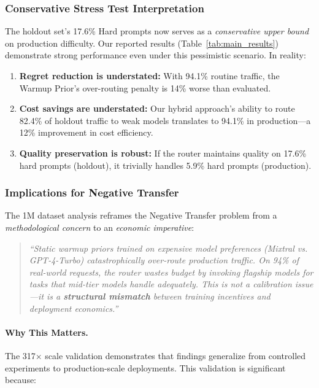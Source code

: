 \subsubsection{Conservative Stress Test Interpretation}

The holdout set's 17.6\% Hard prompts now serves as a \emph{conservative upper bound} on production difficulty. Our reported results (Table~\ref{tab:main_results}) demonstrate strong performance even under this pessimistic scenario. In reality:

\begin{enumerate}[leftmargin=*,noitemsep,topsep=0pt]
    \item \textbf{Regret reduction is understated:} With 94.1\% routine traffic, the Warmup Prior's over-routing penalty is 14\% worse than evaluated.
    \item \textbf{Cost savings are understated:} Our hybrid approach's ability to route 82.4\% of holdout traffic to weak models translates to 94.1\% in production---a 12\% improvement in cost efficiency.
    \item \textbf{Quality preservation is robust:} If the router maintains quality on 17.6\% hard prompts (holdout), it trivially handles 5.9\% hard prompts (production).
\end{enumerate}

\subsubsection{Implications for Negative Transfer}

The 1M dataset analysis reframes the Negative Transfer problem from a \emph{methodological concern} to an \emph{economic imperative}:

\begin{quote}
\emph{``Static warmup priors trained on expensive model preferences (Mixtral vs. GPT-4-Turbo) catastrophically over-route production traffic. On 94\% of real-world requests, the router wastes budget by invoking flagship models for tasks that mid-tier models handle adequately. This is not a calibration issue---it is a \textbf{structural mismatch} between training incentives and deployment economics.''}
\end{quote}

\paragraph{Why This Matters.}
The 317$\times$ scale validation demonstrates that findings generalize from controlled experiments to production-scale deployments. This validation is significant because:

